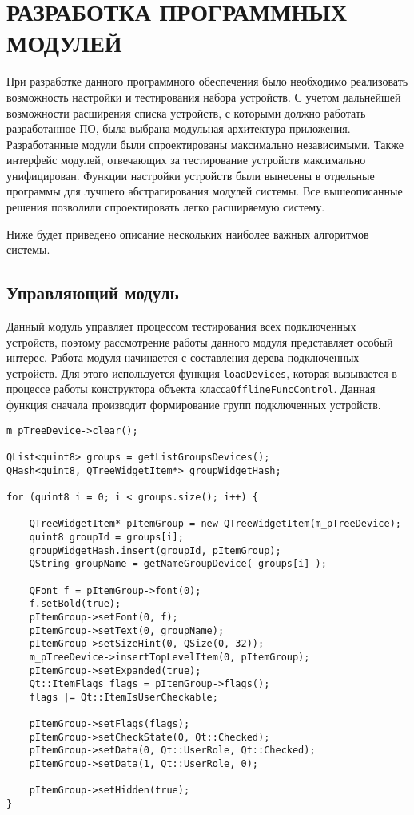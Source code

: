 \section{РАЗРАБОТКА ПРОГРАММНЫХ МОДУЛЕЙ}
\label{sec:modules}

При разработке данного программного обеспечения было необходимо реализовать возможность настройки и тестирования
набора устройств. С учетом дальнейшей возможности расширения списка устройств, с которыми должно работать разработанное
ПО, была выбрана модульная архитектура приложения. Разработанные модули были спроектированы максимально независимыми.
Также интерфейс модулей, отвечающих за тестирование устройств максимально унифицирован. Функции настройки устройств были
вынесены в отдельные программы для лучшего абстрагирования модулей системы. Все вышеописанные решения
позволили спроектировать легко расширяемую систему.

Ниже будет приведено описание нескольких наиболее важных алгоритмов системы.

\subsection{Управляющий модуль}
Данный модуль управляет процессом тестирования всех подключенных устройств, поэтому рассмотрение работы данного модуля
представляет особый интерес.
Работа модуля начинается с составления дерева подключенных устройств. Для этого используется функция
\texttt{loadDevices}, которая вызывается в процессе работы конструктора объекта класса\break \texttt{OfflineFuncControl}.
Данная функция сначала производит формирование групп подключенных устройств.

\medskip
\begin{verbatim}
m_pTreeDevice->clear();

QList<quint8> groups = getListGroupsDevices();
QHash<quint8, QTreeWidgetItem*> groupWidgetHash;

for (quint8 i = 0; i < groups.size(); i++) {

	QTreeWidgetItem* pItemGroup = new QTreeWidgetItem(m_pTreeDevice);
	quint8 groupId = groups[i];
	groupWidgetHash.insert(groupId, pItemGroup);
	QString groupName = getNameGroupDevice( groups[i] );

	QFont f = pItemGroup->font(0);
	f.setBold(true);
	pItemGroup->setFont(0, f);
	pItemGroup->setText(0, groupName);
	pItemGroup->setSizeHint(0, QSize(0, 32));
	m_pTreeDevice->insertTopLevelItem(0, pItemGroup);
	pItemGroup->setExpanded(true);
	Qt::ItemFlags flags = pItemGroup->flags();
	flags |= Qt::ItemIsUserCheckable;

	pItemGroup->setFlags(flags);
	pItemGroup->setCheckState(0, Qt::Checked);
	pItemGroup->setData(0, Qt::UserRole, Qt::Checked);
	pItemGroup->setData(1, Qt::UserRole, 0);

	pItemGroup->setHidden(true);
}
\end{verbatim}
\medskip

